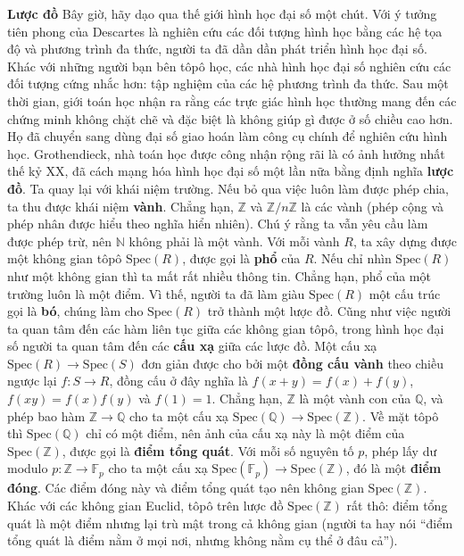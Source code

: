 \begin{multicols}{2}	
	\textbf{\color{duongvaotoanhoc}Lược đồ}
	\vskip 0.1cm
	Bây giờ, hãy dạo qua thế giới hình học đại số một chút. Với ý tưởng tiên phong của Descartes là nghiên cứu các đối tượng hình học bằng các hệ tọa độ và phương trình đa thức, người ta đã dần dần phát triển hình học đại số. Khác với những người bạn bên tôpô học, các nhà hình học đại số nghiên cứu các đối tượng cứng nhắc hơn: tập nghiệm của các hệ phương trình đa thức. Sau một thời gian, giới toán học nhận ra rằng các trực giác hình học thường mang đến các chứng minh không chặt chẽ và đặc biệt là không giúp gì được ở số chiều cao hơn. Họ đã chuyển sang dùng đại số giao hoán làm công cụ chính để nghiên cứu hình học. Grothendieck, nhà toán học được công nhận rộng rãi là có ảnh hưởng nhất thế kỷ XX, đã cách mạng hóa hình học đại số một lần nữa bằng định nghĩa {\bf\color{duongvaotoanhoc} lược đồ}.
	\vskip 0.1cm
	Ta quay lại với khái niệm trường. Nếu bỏ qua việc luôn làm được phép chia, ta thu được khái niệm {\bf\color{duongvaotoanhoc} vành}. Chẳng hạn, $\mathbb{Z}$ và $\mathbb{Z}/n\mathbb{Z}$ là các vành (phép cộng và phép nhân được hiểu theo nghĩa hiển nhiên). Chú ý rằng ta vẫn yêu cầu làm được phép trừ, nên $\mathbb{N}$ không phải là một vành. Với mỗi vành $R$, ta xây dựng được một không gian tôpô $\text{Spec}(R)$, được gọi là {\bf\color{duongvaotoanhoc} phổ} của $R$. Nếu chỉ nhìn $\text{Spec}(R)$ như một không gian thì ta mất rất nhiều thông tin. Chẳng hạn, phổ của một trường luôn là một điểm. Vì thế, người ta đã làm giàu $\text{Spec}(R)$ một cấu trúc gọi là {\bf\color{duongvaotoanhoc} bó}, chúng làm cho $\text{Spec}(R)$ trở thành một lược đồ.
	\vskip 0.1cm
	Cũng như việc người ta quan tâm đến các hàm liên tục giữa các không gian tôpô, trong hình học đại số người ta quan tâm đến các {\bf\color{duongvaotoanhoc} cấu xạ} giữa các lược đồ. Một cấu xạ $\text{Spec}(R) \to \text{Spec}(S)$ đơn giản được cho bởi một {\bf\color{duongvaotoanhoc} đồng cấu vành} theo chiều ngược lại $f: S \to R$, đồng cấu ở đây nghĩa là $f(x+y) = f(x)+f(y)$, $f(xy) = f(x)f(y)$ và $f(1) = 1$. Chẳng hạn, $\mathbb{Z}$ là một vành con của $\mathbb{Q}$, và phép bao hàm $\mathbb{Z} \to \mathbb{Q}$ cho ta một cấu xạ $\text{Spec}(\mathbb{Q}) \to \text{Spec}(\mathbb{Z})$. Về mặt tôpô thì $\text{Spec}(\mathbb{Q})$ chỉ có một điểm, nên ảnh của cấu xạ này là một điểm của $\text{Spec}(\mathbb{Z})$, được gọi là {\bf\color{duongvaotoanhoc} điểm tổng quát}. Với mỗi số nguyên tố $p$, phép lấy dư modulo $p: \mathbb{Z} \to \mathbb{F}_p$ cho ta một cấu xạ $\text{Spec}(\mathbb{F}_p) \to \text{Spec}(\mathbb{Z})$, đó là một {\bf\color{duongvaotoanhoc} điểm đóng}. Các điểm đóng này và điểm tổng quát tạo nên không gian $\text{Spec}(\mathbb{Z})$. Khác với các không gian Euclid, tôpô trên lược đồ $\text{Spec}(\mathbb{Z})$ rất thô: điểm tổng quát là một điểm nhưng lại trù mật trong cả không gian (người ta hay nói ``điểm tổng quát là điểm nằm ở mọi nơi, nhưng không nằm cụ thể ở đâu cả'').

\end{multicols}
